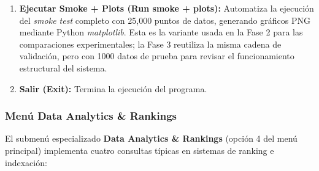 \begin{enumerate}
    \item \textbf{Ejecutar Smoke + Plots (Run smoke + plots):} Automatiza la ejecución del \textit{smoke test} completo con 25,000 puntos de datos, generando gráficos PNG mediante Python \textit{matplotlib}. Esta es la variante usada en la Fase 2 para las comparaciones experimentales; la Fase 3 reutiliza la misma cadena de validación, pero con 1000 datos de prueba para revisar el funcionamiento estructural del sistema.
    
    \item \textbf{Salir (Exit):} Termina la ejecución del programa.
\end{enumerate}

\subsubsection{Menú Data Analytics \& Rankings}\label{sec:data_analytics_menu}

El submenú especializado \textbf{Data Analytics \& Rankings} (opción 4 del menú principal) implementa cuatro consultas típicas en sistemas de ranking e indexación:


